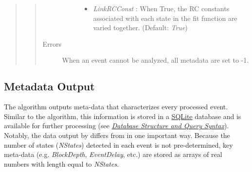 \documentclass[letterpaper,10pt,english]{sphinxmanual}
\begin{document}
\begin{quote}
\begin{quote}
\begin{description}
\begin{description}
\begin{itemize}
\item {} 
\emph{LinkRCConst} :       When True, the RC constants associated with each state in the fit function are varied together. (Default: \emph{True})

\end{itemize}

\end{description}

\item[{Errors}] \leavevmode
When an event cannot be analyzed, all metadata are set to -1.

\end{description}\end{quote}
\end{quote}


\subsection{Metadata Output}
\label{doc/Algorithms:id4}
The {\hyperref[api\string-doc/mosaic.processing:mosaic.adept.adept]{\emph{}}} algorithm outputs meta-data that characterizes every processed event. Similar to the  algorithm, this information is stored in a \href{http://www.sqlite.org/}{SQLite} database and is available for further processing (see {\hyperref[doc/DatabaseStructure:database\string-page]{\emph{Database Structure and Query Syntax}}}). Notably, the data output by {\hyperref[api\string-doc/mosaic.processing:mosaic.adept.adept]{\emph{}}} differs from {\hyperref[api\string-doc/mosaic.processing:mosaic.adept2State.adept2State]{\emph{}}} in one important way. Because the number of states (\emph{NStates}) detected in each event is not pre-determined, key meta-data (e.g. \emph{BlockDepth}, \emph{EventDelay}, etc.) are stored as arrays of real numbers with length equal to \emph{NStates}.
\end{document}

